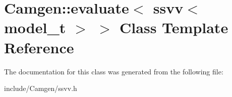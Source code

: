 \hypertarget{a00197}{\section{Camgen\-:\-:evaluate$<$ ssvv$<$ model\-\_\-t $>$ $>$ Class Template Reference}
\label{a00197}
}


The documentation for this class was generated from the following file\-:\begin{DoxyCompactItemize}
\item 
include/\-Camgen/ssvv.\-h\end{DoxyCompactItemize}
